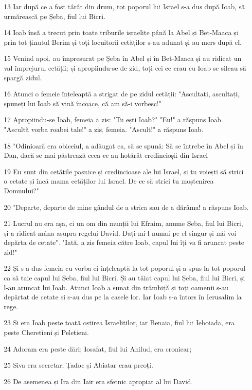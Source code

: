 \par 13 Iar după ce a fost târât din drum, tot poporul lui Israel s-a dus după Ioab, să urmărească pe Șeba, fiul lui Bicri.
\par 14 Ioab însă a trecut prin toate triburile israelite până la Abel și Bet-Maaca și prin tot ținutul Berim și toți locuitorii cetăților s-au adunat și au mers după el.
\par 15 Venind apoi, au împresurat pe Șeba în Abel și în Bet-Maaca și au ridicat un val împrejurul cetății; și apropiindu-se de zid, toți cei ce erau cu Ioab se sileau să spargă zidul.
\par 16 Atunci o femeie înțeleaptă a strigat de pe zidul cetății: "Ascultați, ascultați, spuneți lui Ioab să vină încoace, că am să-i vorbesc!"
\par 17 Apropiindu-se Ioab, femeia a zis: "Tu ești Ioab?" "Eu!" a răspuns Ioab. "Ascultă vorba roabei tale!" a zis, femeia. "Ascult!" a răspuns Ioab.
\par 18 "Odinioară era obiceiul, a adăugat ea, să se spună: Să se întrebe în Abel și în Dan, dacă se mai păstrează ceea ce au hotărât credincioșii din Israel
\par 19 Eu sunt din cetățile pașnice și credincioase ale lui Israel, și tu voiești să strici o cetate și încă mama cetăților lui Israel. De ce să strici tu moștenirea Domnului?"
\par 20 "Departe, departe de mine gândul de a strica sau de a dărâma! a răspuns Ioab.
\par 21 Lucrul nu era așa, ci un om din munții lui Efraim, anume Șeba, fiul lui Bicri, și-a ridicat mâna asupra regelui David. Dați-mi-l numai pe el singur și mă voi depărta de cetate". "Iată, a zis femeia către Ioab, capul lui îți va fi aruncat peste zid!"
\par 22 Și s-a dus femeia cu vorba ei înțeleaptă la tot poporul și a spus la tot poporul ca să taie capul lui Șeba, fiul lui Bicri. Și au tăiat capul lui Șeba, fiul lui Bicri, și l-au aruncat lui Ioab. Atunci Ioab a sunat din trâmbiță și toți oamenii s-au depărtat de cetate și s-au dus pe la casele lor. Iar Ioab s-a întors în Ierusalim la rege.
\par 23 Și era Ioab peste toată oștirea Israeliților, iar Benaia, fiul lui Iehoiada, era peste Cheretieni și Peletieni.
\par 24 Adoram era peste dări; Iosafat, fiul lui Ahilud, era cronicar;
\par 25 Siva era secretar; Țadoc și Abiatar erau preoți.
\par 26 De asemenea și Ira din Iair era sfetnic apropiat al lui David.

